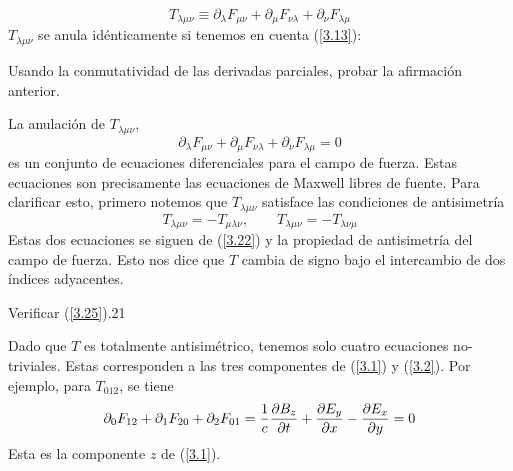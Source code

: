 \begin{equation}\label{3.22}
    T_{\lambda\mu\nu}\equiv \partial_\lambda F_{\mu\nu}+\partial_\mu F_{\nu\lambda}+\partial_\nu F_{\lambda\mu}
\end{equation}
$T_{\lambda\mu\nu}$ se anula idénticamente si tenemos en cuenta (\ref{3.13}):
\begin{tcolorbox}
    Usando la conmutatividad de las derivadas parciales, probar la afirmación anterior.
\end{tcolorbox}
La anulación de $T_{\lambda\mu\nu}$,
\begin{equation}
    \boxed{\partial_\lambda F_{\mu\nu}+\partial_\mu F_{\nu\lambda}+\partial_\nu F_{\lambda\mu}=0}
\end{equation}
es un conjunto de ecuaciones diferenciales para el campo de fuerza. Estas ecuaciones son precisamente las ecuaciones de Maxwell libres de fuente. Para clarificar esto, primero notemos que $T_{\lambda\mu\nu}$ satisface las condiciones de antisimetría
\begin{equation}\label{3.25}
    T_{\lambda\mu\nu}=-T_{\mu\lambda\nu},\qquad T_{\lambda\mu\nu}=-T_{\lambda\nu\mu}
\end{equation}
Estas dos ecuaciones se siguen de (\ref{3.22}) y la propiedad de antisimetría del campo de fuerza. Esto nos dice que $T$ cambia de signo bajo el intercambio de dos índices adyacentes.
\begin{tcolorbox}
    Verificar (\ref{3.25}).21
\end{tcolorbox}
Dado que $T$ es totalmente antisimétrico, tenemos solo cuatro ecuaciones no-triviales. Estas corresponden a las tres componentes de (\ref{3.1}) y (\ref{3.2}). Por ejemplo, para $T_{012}$, se tiene
\begin{equation}\label{3.26}
    \partial_0 F_{12}+\partial_1 F_{20}+\partial_2 F_{01}=\frac{1}{c}\pdv{B_z}{t}+\pdv{E_y}{x}-\pdv{E_x}{y}=0
\end{equation}
Esta es la componente $z$ de (\ref{3.1}). 

